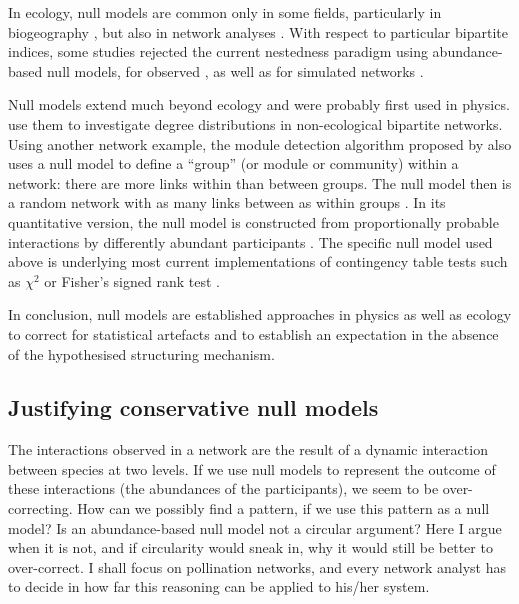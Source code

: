 \documentclass[a4paper, 11pt]{article}\usepackage[]{graphicx}\usepackage[dvipsnames]{xcolor}
\newcommand{\ind}[1]{#1\index{#1}}           			   %
\begin{document}
In ecology, \ind{null model}s are common only in some fields, particularly in biogeography \citep{Gotelli1996,Hausdorf2007}, but also in network analyses \citep{Dormann2009,Joppa2009,Bluthgen2008,Vazquez2006,Vazquez2003a,Vazquez2009}. With respect to particular bipartite indices, some studies rejected the current nestedness paradigm using abundance-based null models, for observed \citep{Kallimanis2009,Moore2007,Santamaria2007}, as well as for simulated networks \citep{Krishna2008}.

Null models extend much beyond ecology and were probably first used in physics. \citet{Latapy2008} use them to investigate degree distributions in non-ecological bipartite networks. Using another network example, the module detection algorithm proposed by \citet{Newman2004} also uses a null model to define a ``group'' (or module or community) within a network: there are more links within than between groups. The null model then is a random network with as many links between as within groups \citep{Guimera2005}. In its quantitative version, the null model is constructed from proportionally probable interactions by differently abundant participants \citep{Barber2004}. The specific null model used above is underlying most current implementations of contingency table tests such as $\chi^2$ or Fisher's signed rank test \citep{Patefield1981}.

In conclusion, null models are established approaches in physics as well as ecology to correct for statistical artefacts and to establish an expectation in the absence of the hypothesised structuring mechanism.

\subsection{Justifying conservative null models}
The interactions observed in a network are the result of a dynamic interaction between species at two levels. If we use null models to represent the outcome of these interactions (the abundances of the participants), we seem to be over-correcting. How can we possibly find a pattern, if we use this pattern as a null model? Is an abundance-based null model not a circular argument? Here I argue when it is not, and if \ind{circularity} would sneak in, why it would still be better to over-correct. I shall focus on pollination networks, and every network analyst has to decide in how far this reasoning can be applied to his/her system.
\end{document}
